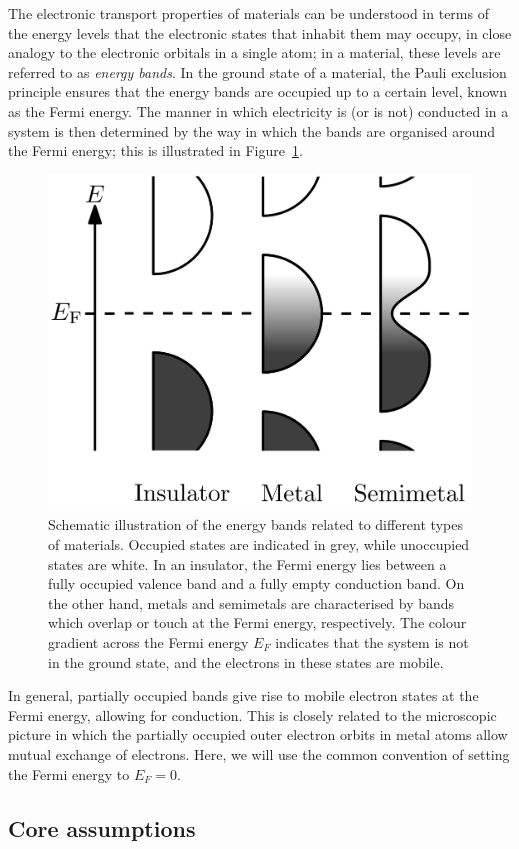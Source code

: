 The electronic transport properties of materials can be understood in terms of the energy levels that the electronic states that inhabit them may occupy, in close analogy to the electronic orbitals in a single atom; in a material, these levels are referred to as \emph{energy bands}. In the ground state of a material, the Pauli exclusion principle ensures that the energy bands are occupied up to a certain level, known as the Fermi energy. The manner in which electricity is (or is not) conducted in a system is then determined by the way in which the bands are organised around the Fermi energy; this is illustrated in Figure~\ref{fig:bands}.
\begin{figure}[htb!]
	\centering
	\includegraphics[width=.7\linewidth]{Images/bands}
	\caption{Schematic illustration of the energy bands related to different types of materials. Occupied states are indicated in grey, while unoccupied states are white. In an insulator, the Fermi energy lies between a fully occupied valence band and a fully empty conduction band. On the other hand, metals and semimetals are characterised by bands which overlap or touch at the Fermi energy, respectively. The colour gradient across the Fermi energy $E_F$ indicates that the system is not in the ground state, and the electrons in these states are mobile.}
	\label{fig:bands}
\end{figure}
In general, partially occupied bands give rise to mobile electron states at the Fermi energy, allowing for conduction. This is closely related to the microscopic picture in which the partially occupied outer electron orbits in metal atoms allow mutual exchange of electrons. Here, we will use the common convention of setting the Fermi energy to $E_F=0$.


\subsection{Core assumptions}

